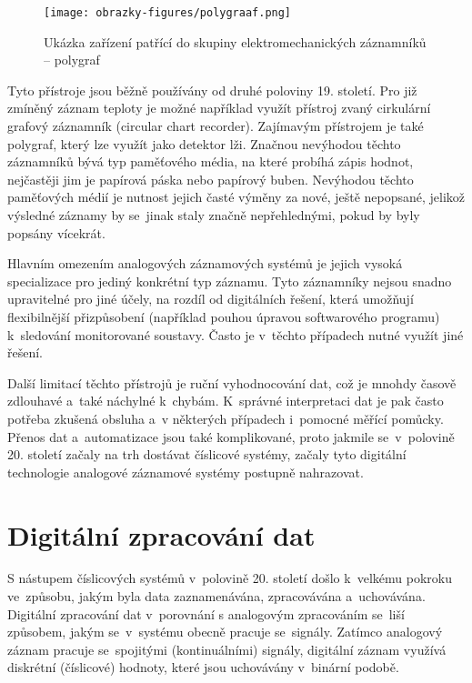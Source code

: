 
\begin{figure}[h] %
    \centering
    \texttt{[image: obrazky-figures/polygraaf.png]}
    \caption{Ukázka zařízení patřící do skupiny elektromechanických záznamníků -- polygraf~\cite{polygraph_picture}}
    \label{fig:polygraaf}
\end{figure}


Tyto přístroje jsou běžně používány od druhé poloviny 19. století. Pro již zmíněný záznam teploty je možné například využít přístroj zvaný cirkulární grafový záznamník (circular chart recorder). Zajímavým přístrojem je také polygraf, který lze využít jako detektor lži. Značnou nevýhodou těchto záznamníků bývá typ paměťového média, na které probíhá zápis hodnot, nejčastěji jim je papírová páska nebo papírový buben. Nevýhodou těchto paměťových médií je nutnost jejich časté výměny za nové, ještě nepopsané, jelikož výsledné záznamy by se~jinak staly značně nepřehlednými, pokud by byly popsány vícekrát.~\cite{origin_of_chart_recorders}

Hlavním omezením analogových záznamových systémů je jejich vysoká specializace pro jediný konkrétní typ záznamu. Tyto záznamníky nejsou snadno upravitelné pro jiné účely, na rozdíl od digitálních řešení, která umožňují flexibilnější přizpůsobení (například pouhou úpravou softwarového programu) k~sledování monitorované soustavy. Často je v~těchto případech nutné využít jiné řešení.~\cite{analog_signal_and_digital_signal_processing_Tel_System}

Další limitací těchto přístrojů je ruční vyhodnocování dat, což je mnohdy časově zdlouhavé a~také náchylné k~chybám. K~správné interpretaci dat je pak často potřeba zkušená obsluha a~v některých případech i~pomocné měřící pomůcky. Přenos dat a~automatizace jsou také komplikované, proto jakmile se~v~polovině 20. století začaly na trh dostávat číslicové systémy, začaly tyto digitální technologie analogové záznamové systémy postupně nahrazovat.~\cite{rcp_analog_vs_digital, newcastle_history_of_digital_computers}


\section{Digitální zpracování dat}
\label{digitalni_zaznam_dat}
S nástupem číslicových systémů v~polovině 20. století došlo k~velkému pokroku ve~způsobu, jakým byla data zaznamenávána, zpracovávána a~uchovávána. Digitální zpracování dat v~porovnání s analogovým zpracováním se~liší způsobem, jakým se~v~systému obecně pracuje se~signály. Zatímco analogový záznam pracuje se~spojitými (kontinuálními) signály, digitální záznam využívá diskrétní (číslicové) hodnoty, které jsou uchovávány v~binární podobě.

